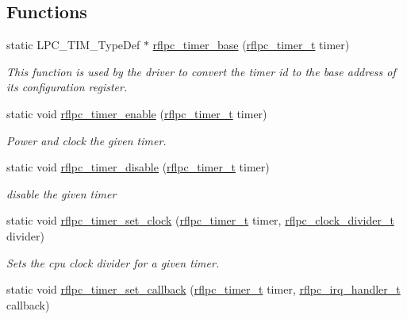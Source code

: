 \subsection*{Functions}
\begin{DoxyCompactItemize}
\item 
static L\-P\-C\-\_\-\-T\-I\-M\-\_\-\-Type\-Def $\ast$ \hyperlink{group__timer_ga50c78f3d07b2065c64c51bea91d593db}{rflpc\-\_\-timer\-\_\-base} (\hyperlink{group__timer_gac08825cb88d61086e74638b859cb8b34}{rflpc\-\_\-timer\-\_\-t} timer)
\begin{DoxyCompactList}\small\item\em This function is used by the driver to convert the timer id to the base address of its configuration register. \end{DoxyCompactList}\item 
static void \hyperlink{group__timer_gac3200d2da39f6c6975220c757fc51e18}{rflpc\-\_\-timer\-\_\-enable} (\hyperlink{group__timer_gac08825cb88d61086e74638b859cb8b34}{rflpc\-\_\-timer\-\_\-t} timer)
\begin{DoxyCompactList}\small\item\em Power and clock the given timer. \end{DoxyCompactList}\item 
static void \hyperlink{group__timer_gae5fbc12700e137ec4231d691ee2de948}{rflpc\-\_\-timer\-\_\-disable} (\hyperlink{group__timer_gac08825cb88d61086e74638b859cb8b34}{rflpc\-\_\-timer\-\_\-t} timer)
\begin{DoxyCompactList}\small\item\em disable the given timer \end{DoxyCompactList}\item 
static void \hyperlink{group__timer_gae9545ba61ff95f505f58f476e49af10b}{rflpc\-\_\-timer\-\_\-set\-\_\-clock} (\hyperlink{group__timer_gac08825cb88d61086e74638b859cb8b34}{rflpc\-\_\-timer\-\_\-t} timer, \hyperlink{group__clock_gaf3b7fc561cd12dfdff9f7c1357c3f016}{rflpc\-\_\-clock\-\_\-divider\-\_\-t} divider)
\begin{DoxyCompactList}\small\item\em Sets the cpu clock divider for a given timer. \end{DoxyCompactList}\item 
static void \hyperlink{group__timer_gab2799548ac7ff99c8a2e2266d0a67990}{rflpc\-\_\-timer\-\_\-set\-\_\-callback} (\hyperlink{group__timer_gac08825cb88d61086e74638b859cb8b34}{rflpc\-\_\-timer\-\_\-t} timer, \hyperlink{group__irq_ga4970a8a2cf9b63e4c261982504669a1f}{rflpc\-\_\-irq\-\_\-handler\-\_\-t} callback)

\end{DoxyCompactItemize}
